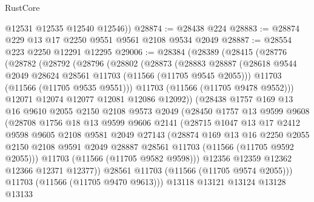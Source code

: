 \begin{lexlean}{RustCore}
\begin{coremodule}
        @12531
        @12535
        @12540
        @12546))
@28874 := @28438 @224
@28883 := @28874 @229 @13 @17 @2250 @9551 @9561 @2108 @9534 @2049
@28887 := @28554 @223 @2250 @12291 @12295
@29006 := @28384
    (@28389
      (@28415
        (@28776
          (@28782
            (@28792
              (@28796
                (@28802
                  (@28873
                    (@28883
                      @28887
                      (@28618 @9544 @2049 @28624 @28561 @11703 (@11566 (@11705 @9545 @2055)))
                      @11703
                      (@11566 (@11705 @9535 @9551)))
                    @11703
                    (@11566 (@11705 @9478 @9552)))
                  @12071
                  @12074
                  @12077
                  @12081
                  @12086
                  @12092))
              (@28438
                @1757
                @169
                @13
                @16
                @9610
                @2055
                @2150
                @2108
                @9573
                @2049
                (@28450
                  @1757
                  @13
                  @9599
                  @9608
                  (@28708
                    @1756
                    @18
                    @13
                    @9599
                    @9606
                    @2141
                    (@28715
                      @1047
                      @13
                      @17
                      @2412
                      @9598
                      @9605
                      @2108
                      @9581
                      @2049
                      @27143
                      (@28874
                        @169
                        @13
                        @16
                        @2250
                        @2055
                        @2150
                        @2108
                        @9591
                        @2049
                        @28887
                        @28561
                        @11703
                        (@11566 (@11705 @9592 @2055)))
                      @11703
                      (@11566 (@11705 @9582 @9598)))
                    @12356
                    @12359
                    @12362
                    @12366
                    @12371
                    @12377))
                @28561
                @11703
                (@11566 (@11705 @9574 @2055)))
              @11703
              (@11566 (@11705 @9470 @9613)))
            @13118
            @13121
            @13124
            @13128
            @13133

\end{coremodule}
\end{lexlean}
